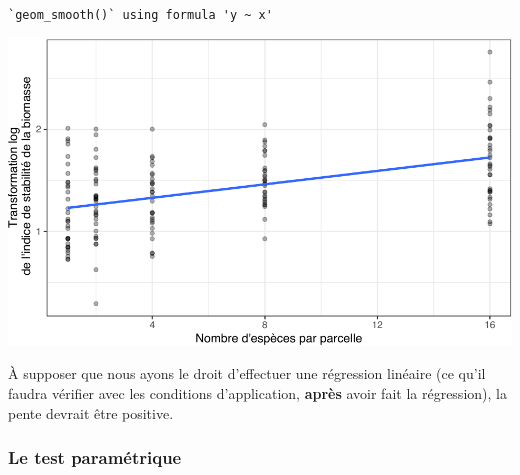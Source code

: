 \documentclass[
  a4paper,
]{article}
\newenvironment{Shaded}{\begin{snugshade}}{\end{snugshade}}
\newcommand{\CharTok}[1]{\textcolor[rgb]{0.57,0.30,0.62}{#1}}
\newcommand{\DataTypeTok}[1]{\textcolor[rgb]{0.00,0.34,0.68}{#1}}
\newcommand{\FloatTok}[1]{\textcolor[rgb]{0.69,0.50,0.00}{#1}}
\newcommand{\KeywordTok}[1]{\textcolor[rgb]{0.12,0.11,0.11}{\textbf{#1}}}
\newcommand{\NormalTok}[1]{\textcolor[rgb]{0.12,0.11,0.11}{#1}}
\newcommand{\OperatorTok}[1]{\textcolor[rgb]{0.12,0.11,0.11}{#1}}
\newcommand{\OtherTok}[1]{\textcolor[rgb]{0.00,0.43,0.16}{#1}}
\newcommand{\StringTok}[1]{\textcolor[rgb]{0.75,0.01,0.01}{#1}}
\begin{document}
\begin{Shaded}
\end{Shaded}

\begin{verbatim}
`geom_smooth()` using formula 'y ~ x'
\end{verbatim}

\begin{center}\includegraphics[width=0.9\linewidth]{figure/unnamed-chunk-118-1} \end{center}

À supposer que nous ayons le droit d'effectuer une régression linéaire (ce qu'il faudra vérifier avec les conditions d'application, \textbf{après} avoir fait la régression), la pente devrait être positive.

\hypertarget{le-test-paramuxe9trique-5}{%
\subsubsection{Le test paramétrique}\label{le-test-paramuxe9trique-5}}
\end{document}
